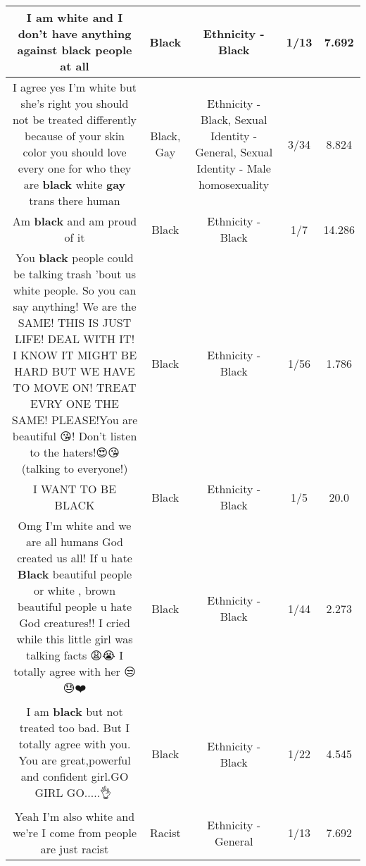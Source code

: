\documentclass[11pt]{article}
\newlength\mylength
\begin{document}
\begin{center}
\begin{longtable}{|C{.65\mylength}|C{.30\mylength}|C{.12\mylength}|C{.12\mylength}|C{.12\mylength}|}
  \small I am white and I don't have anything against \textbf{black} people at all\normalsize   & Black & Ethnicity - Black & 1/13 & 7.692 \\  \hline
  \small I agree yes I'm white but she's right you should not be treated differently because of your skin color you should love every one for who they are \textbf{black} white \textbf{g\textbf{ay}} trans there human\normalsize   & Black, Gay & Ethnicity - Black, Sexual Identity - General, Sexual Identity - Male homosexuality & 3/34 & 8.824 \\  \hline
  \small Am \textbf{black} and am proud  of  it\normalsize   & Black & Ethnicity - Black & 1/7 & 14.286 \\  \hline
  \small You \textbf{black} people could be talking trash 'bout us white people. So you can say anything! We are the SAME! THIS IS JUST LIFE! DEAL WITH IT! I KNOW IT MIGHT BE HARD BUT WE HAVE TO MOVE ON! TREAT EVRY ONE THE SAME! PLEASE!You are beautiful 😘! Don't listen to the haters!😍😘(talking to everyone!)\normalsize   & Black & Ethnicity - Black & 1/56 & 1.786 \\  \hline
  \small I WANT TO BE BLACK\normalsize   & Black & Ethnicity - Black & 1/5 & 20.0 \\  \hline
  \small Omg I'm white and we are all humans God created us all! If u hate \textbf{Black} beautiful people or white , brown beautiful people u hate God creatures!! I cried while this little girl was talking facts 😩😭 I totally agree with her 😒😓❤️\normalsize   & Black & Ethnicity - Black & 1/44 & 2.273 \\  \hline
  \small I am \textbf{black} but not treated too bad. But I totally agree with you. You are great,powerful and confident girl.GO GIRL GO.....👌👏\normalsize   & Black & Ethnicity - Black & 1/22 & 4.545 \\  \hline
  \small Yeah I'm also white and we're I come from people are just racist\normalsize   & Racist & Ethnicity - General & 1/13 & 7.692 \\  \hline

\end{longtable}
\end{center}
\end{document}
